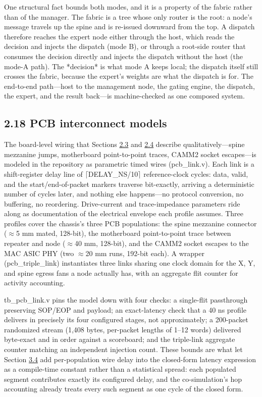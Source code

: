 \documentclass[10pt,twocolumn]{article}
\begin{document}
One structural fact bounds both modes, and it is a property of the fabric rather than of the manager. The fabric is a tree whose only router is the root: a node's message travels up the spine and is re-issued downward from the top. A dispatch therefore reaches the expert node either through the host, which reads the decision and injects the dispatch (mode B), or through a root-side router that consumes the decision directly and injects the dispatch without the host (the mode-A path). The *decision* is what mode A keeps local; the dispatch itself still crosses the fabric, because the expert's weights are what the dispatch is for. The end-to-end path---host to the management node, the gating engine, the dispatch, the expert, and the result back---is machine-checked as one composed system.

\subsection*{2.18 PCB interconnect models}\label{sec:2.18}

The board-level wiring that Sections \hyperref[sec:2.3]{2.3} and \hyperref[sec:2.4]{2.4} describe qualitatively---spine mezzanine jumps, motherboard point-to-point traces, CAMM2 socket escapes---is modeled in the repository as parametric timed wires (pcb\_link.v). Each link is a shift-register delay line of $\lceil$DELAY\_NS/10$\rceil$ reference-clock cycles: data, valid, and the start/end-of-packet markers traverse bit-exactly, arriving a deterministic number of cycles later, and nothing else happens---no protocol conversion, no buffering, no reordering. Drive-current and trace-impedance parameters ride along as documentation of the electrical envelope each profile assumes. Three profiles cover the chassis's three PCB populations: the spine mezzanine connector ($\approx$5 mm mated, 128-bit), the motherboard point-to-point trace between repeater and node ($\approx$40 mm, 128-bit), and the CAMM2 socket escapes to the MAC ASIC PHY (two $\approx$20 mm runs, 192-bit each). A wrapper (pcb\_triple\_link) instantiates three links sharing one clock domain for the X, Y, and spine egress fans a node actually has, with an aggregate flit counter for activity accounting.

tb\_pcb\_link.v pins the model down with four checks: a single-flit passthrough preserving SOP/EOP and payload; an exact-latency check that a 40 ns profile delivers in precisely its four configured stages, not approximately; a 200-packet randomized stream (1,408 bytes, per-packet lengths of 1--12 words) delivered byte-exact and in order against a scoreboard; and the triple-link aggregate counter matching an independent injection count. These bounds are what let Section \hyperref[sec:3.4]{3.4} add per-population wire delay into the closed-form latency expression as a compile-time constant rather than a statistical spread: each populated segment contributes exactly its configured delay, and the co-simulation's hop accounting already treats every such segment as one cycle of the closed form.
\end{document}
